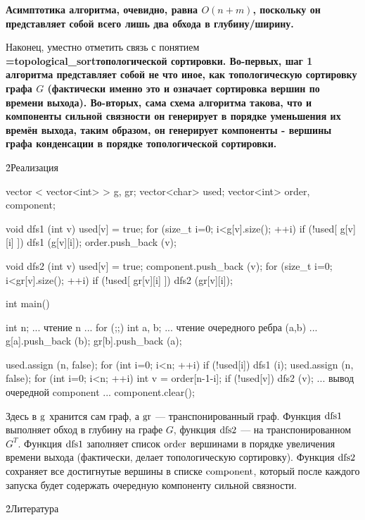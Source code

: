 \bf{Асимптотика} алгоритма, очевидно, равна $O(n+m)$, поскольку он представляет собой всего лишь два обхода в глубину/ширину.

Наконец, уместно отметить связь с понятием \bf{\algohref=topological_sort{топологической сортировки}}. Во-первых, шаг 1 алгоритма представляет собой не что иное, как топологическую сортировку графа $G$ (фактически именно это и означает сортировка вершин по времени выхода). Во-вторых, сама схема алгоритма такова, что и компоненты сильной связности он генерирует в порядке уменьшения их времён выхода, таким образом, он генерирует компоненты - вершины графа конденсации в порядке топологической сортировки.

\h2{Реализация}

\code
vector < vector<int> > g, gr;
vector<char> used;
vector<int> order, component;

void dfs1 (int v) {
	used[v] = true;
	for (size_t i=0; i<g[v].size(); ++i)
		if (!used[ g[v][i] ])
			dfs1 (g[v][i]);
	order.push_back (v);
}

void dfs2 (int v) {
	used[v] = true;
	component.push_back (v);
	for (size_t i=0; i<gr[v].size(); ++i)
		if (!used[ gr[v][i] ])
			dfs2 (gr[v][i]);
}

int main() {
	int n;
	... чтение n ...
	for (;;) {
		int a, b;
		... чтение очередного ребра (a,b) ...
		g[a].push_back (b);
		gr[b].push_back (a);
	}

	used.assign (n, false);
	for (int i=0; i<n; ++i)
		if (!used[i])
			dfs1 (i);
	used.assign (n, false);
	for (int i=0; i<n; ++i) {
		int v = order[n-1-i];
		if (!used[v]) {
			dfs2 (v);
			... вывод очередной component ...
			component.clear();
		}
	}
}
\endcode

Здесь в $\rm g$ хранится сам граф, а $\rm gr$ --- транспонированный граф. Функция $\rm dfs1$ выполняет обход в глубину на графе $G$, функция $\rm dfs2$ --- на транспонированном $G^T$. Функция $\rm dfs1$ заполняет список $\rm order$ вершинами в порядке увеличения времени выхода (фактически, делает топологическую сортировку). Функция $\rm dfs2$ сохраняет все достигнутые вершины в списке $\rm component$, который после каждого запуска будет содержать очередную компоненту сильной связности.

\h2{Литература}

\ul{
\li {}
\li {}
}